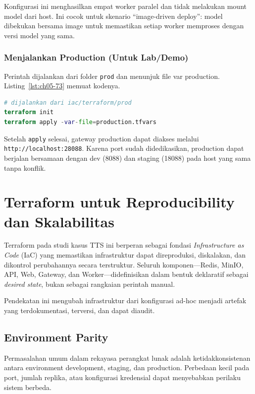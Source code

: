 Konfigurasi ini menghasilkan empat worker paralel dan tidak melakukan mount model dari host. Ini cocok untuk skenario ``image-driven deploy'': model dibekukan bersama image untuk memastikan setiap worker memproses dengan versi model yang sama.

\subsubsection{Menjalankan Production (Untuk Lab/Demo)}

Perintah dijalankan dari folder \texttt{prod} dan menunjuk file var production. Listing~\ref{lst:ch05-73} memuat kodenya.

\begin{lstlisting}[language=terraform, caption={Potongan kode Terraform pada Menjalankan Production (Untuk Lab/Demo)}, label={lst:ch05-73}]
# dijalankan dari iac/terraform/prod
terraform init
terraform apply -var-file=production.tfvars
\end{lstlisting}

Setelah \texttt{apply} selesai, gateway production dapat diakses melalui \texttt{http://localhost:28088}. Karena port sudah didedikasikan, production dapat berjalan bersamaan dengan dev (8088) dan staging (18088) pada host yang sama tanpa konflik.





\section{Terraform untuk Reproducibility dan Skalabilitas}

Terraform pada studi kasus TTS ini berperan sebagai fondasi \textit{Infrastructure as Code} (IaC) yang memastikan infrastruktur dapat direproduksi, diskalakan, dan dikontrol perubahannya secara terstruktur. Seluruh komponen—Redis, MinIO, API, Web, Gateway, dan Worker—didefinisikan dalam bentuk deklaratif sebagai \textit{desired state}, bukan sebagai rangkaian perintah manual.

Pendekatan ini mengubah infrastruktur dari konfigurasi ad-hoc menjadi artefak yang terdokumentasi, terversi, dan dapat diaudit.

\subsection*{Environment Parity}

Permasalahan umum dalam rekayasa perangkat lunak adalah ketidakkonsistenan antara environment development, staging, dan production. Perbedaan kecil pada port, jumlah replika, atau konfigurasi kredensial dapat menyebabkan perilaku sistem berbeda.

